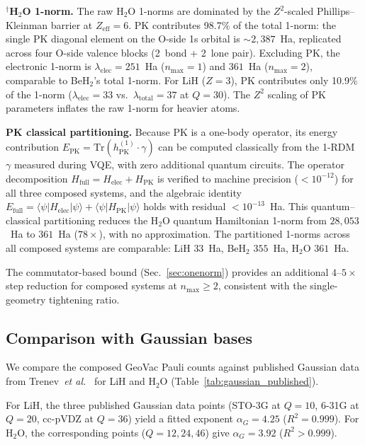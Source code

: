 \documentclass[aps,pra,twocolumn,superscriptaddress,longbibliography]{revtex4-2}
\begin{document}
$^\dagger$\textbf{H$_2$O 1-norm.}  The raw H$_2$O 1-norms are
dominated by the $Z^2$-scaled Phillips--Kleinman barrier at
$Z_{\mathrm{eff}} = 6$.  PK contributes 98.7\% of the total 1-norm:
the single PK diagonal element on the O-side 1s orbital is
$\sim 2{,}387$~Ha, replicated across four O-side valence blocks
(2~bond + 2~lone pair).  Excluding PK, the electronic 1-norm is
$\lambda_{\mathrm{elec}} = 251$~Ha ($n_{\max} = 1$) and $361$~Ha
($n_{\max} = 2$), comparable to BeH$_2$'s total 1-norm.  For LiH
($Z = 3$), PK contributes only 10.9\% of the 1-norm ($\lambda_{\mathrm{elec}} = 33$
vs.\ $\lambda_{\mathrm{total}} = 37$ at $Q = 30$).  The $Z^2$ scaling
of PK parameters inflates the raw 1-norm for heavier atoms.

\textbf{PK classical partitioning.}
Because PK is a one-body operator, its energy contribution
$E_{\mathrm{PK}} = \mathrm{Tr}(h^{(1)}_{\mathrm{PK}} \cdot \gamma)$
can be computed classically from the 1-RDM $\gamma$ measured during VQE,
with zero additional quantum circuits.  The operator decomposition
$H_{\mathrm{full}} = H_{\mathrm{elec}} + H_{\mathrm{PK}}$ is verified
to machine precision ($< 10^{-12}$) for all three composed systems,
and the algebraic identity
$E_{\mathrm{full}} = \langle\psi|H_{\mathrm{elec}}|\psi\rangle
+ \langle\psi|H_{\mathrm{PK}}|\psi\rangle$
holds with residual $< 10^{-13}$~Ha.
This quantum--classical partitioning reduces the H$_2$O quantum
Hamiltonian 1-norm from $28{,}053$~Ha to $361$~Ha ($78\times$),
with no approximation.  The partitioned 1-norms across all composed
systems are comparable: LiH $33$~Ha, BeH$_2$ $355$~Ha, H$_2$O
$361$~Ha.

The commutator-based bound (Sec.~\ref{sec:onenorm}) provides an
additional $4$--$5\times$ step reduction for composed systems at
$n_{\max} \ge 2$, consistent with the single-geometry tightening
ratio.


\subsection{Comparison with Gaussian bases}
\label{sec:composed_gaussian}

We compare the composed GeoVac Pauli counts against published
Gaussian data from Trenev~\textit{et al.}~\cite{trenev2025} for LiH
and H$_2$O (Table~\ref{tab:gaussian_published}).

For LiH, the three published Gaussian data points (STO-3G at $Q = 10$,
6-31G at $Q = 20$, cc-pVDZ at $Q = 36$) yield a fitted exponent
$\alpha_G = 4.25$ ($R^2 = 0.999$).  For H$_2$O, the corresponding
points ($Q = 12, 24, 46$) give $\alpha_G = 3.92$ ($R^2 > 0.999$).
\end{document}
